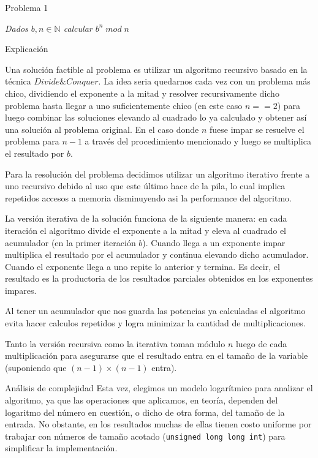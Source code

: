 \begin{section}{Problema 1}

	\textit{Dados $b,n \in \mathbb{N} $ calcular $b^n\; mod\; n$}

	\begin{subsection}{Explicación}

		Una solución factible al problema es utilizar un algoritmo recursivo basado en la técnica $Divide \& Conquer$.
		La idea seria quedarnos cada vez con un problema más chico, dividiendo el exponente a la mitad y resolver recursivamente dicho problema hasta llegar a uno suficientemente chico (en este caso $n==2$) para luego combinar las soluciones elevando al cuadrado lo ya calculado y obtener así una solución al problema original. En el caso donde $n$ fuese impar se resuelve el problema para $n-1$ a través del procedimiento mencionado y luego se multiplica el resultado por $b$.

		Para la resolución del problema decidimos utilizar un algoritmo iterativo frente a uno recursivo debido al uso que este último hace de la pila, lo cual implica repetidos accesos a memoria disminuyendo asi la performance del algoritmo.

		La versión iterativa de la solución funciona de la siguiente manera: en cada iteración el algoritmo divide el exponente a la mitad y eleva al cuadrado el acumulador (en la primer iteración $b$). Cuando llega a un exponente impar multiplica el resultado por el acumulador y continua elevando dicho acumulador. Cuando el exponente llega a uno repite lo anterior y termina. Es decir, el resultado es la productoria de los resultados parciales obtenidos en los exponentes impares.

		Al tener un acumulador que nos guarda las potencias ya calculadas el algoritmo evita hacer calculos repetidos y logra minimizar la cantidad de multiplicaciones.

		Tanto la versión recursiva como la iterativa toman módulo $n$ luego de cada multiplicación para asegurarse que el resultado entra en el tamaño de la variable (suponiendo que $(n-1)\times (n-1)$ entra).


		\begin{subsubsection}{Análisis de complejidad}
		Esta vez, elegimos un modelo logarítmico para analizar el algoritmo, ya que las operaciones que aplicamos, en teoría, dependen del logaritmo del número en cuestión, o dicho de otra forma, del tamaño de la entrada. No obstante, en los resultados muchas de ellas tienen costo uniforme por trabajar con números de tamaño acotado (\texttt{unsigned long long int}) para simplificar la implementación.\Pa


\end{subsubsection}
\end{subsection}
\end{section}
